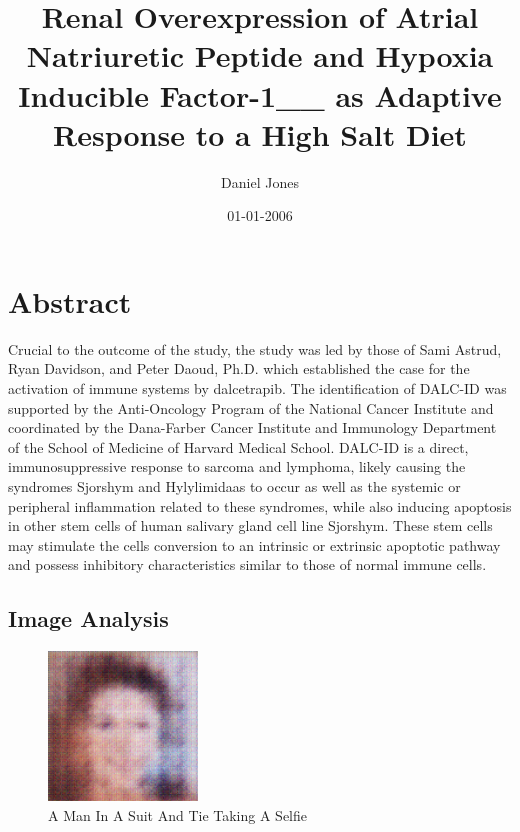 \documentclass{article}%
\title{Renal Overexpression of Atrial Natriuretic Peptide and Hypoxia Inducible Factor{-}1\_\_ as Adaptive Response to a High Salt Diet}%
\author{Daniel Jones}%
\affil{Department of Minimally Invasive Surgery, The First Affiliated Hospital of Nanjing Medical University, Nanjing 210029, P.R. China}%
\date{01{-}01{-}2006}%
\begin{document}
%
\normalsize%
\maketitle%
\section{Abstract}%
\label{sec:Abstract}%
Crucial to the outcome of the study, the study was led by those of Sami Astrud, Ryan Davidson, and Peter Daoud, Ph.D. which established the case for the activation of immune systems by dalcetrapib. The identification of DALC{-}ID was supported by the Anti{-}Oncology Program of the National Cancer Institute and coordinated by the Dana{-}Farber Cancer Institute and Immunology Department of the School of Medicine of Harvard Medical School. DALC{-}ID is a direct, immunosuppressive response to sarcoma and lymphoma, likely causing the syndromes Sjorshym and Hylylimidaas to occur as well as the systemic or peripheral inflammation related to these syndromes, while also inducing apoptosis in other stem cells of human salivary gland cell line Sjorshym. These stem cells may stimulate the cells conversion to an intrinsic or extrinsic apoptotic pathway and possess inhibitory characteristics similar to those of normal immune cells.

%
\subsection{Image Analysis}%
\label{subsec:ImageAnalysis}%


\begin{figure}[h!]%
\centering%
\includegraphics[width=150px]{500_fake_images/samples_5_23.png}%
\caption{A Man In A Suit And Tie Taking A Selfie}%
\end{figure}

%
\end{document}
